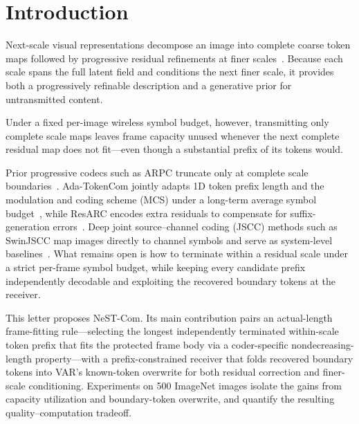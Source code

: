 \section{Introduction}
Next-scale visual representations decompose an image into complete coarse token maps followed by progressive residual refinements at finer scales~\cite{var}. Because each scale spans the full latent field and conditions the next finer scale, it provides both a progressively refinable description and a generative prior for untransmitted content.

Under a fixed per-image wireless symbol budget, however, transmitting only complete scale maps leaves frame capacity unused whenever the next complete residual map does not fit---even though a substantial prefix of its tokens would.

Prior progressive codecs such as ARPC truncate only at complete scale boundaries~\cite{arpc}. Ada-TokenCom jointly adapts 1D token prefix length and the modulation and coding scheme (MCS) under a long-term average symbol budget~\cite{adatokencom}, while ResARC encodes extra residuals to compensate for suffix-generation errors~\cite{resarc}. Deep joint source--channel coding (JSCC) methods such as SwinJSCC map images directly to channel symbols and serve as system-level baselines~\cite{swinjscc}. What remains open is how to terminate within a residual scale under a strict per-frame symbol budget, while keeping every candidate prefix independently decodable and exploiting the recovered boundary tokens at the receiver.

This letter proposes NeST-Com. Its main contribution pairs an actual-length frame-fitting rule---selecting the longest independently terminated within-scale token prefix that fits the protected frame body via a coder-specific nondecreasing-length property---with a prefix-constrained receiver that folds recovered boundary tokens into VAR's known-token overwrite for both residual correction and finer-scale conditioning. Experiments on 500 ImageNet images isolate the gains from capacity utilization and boundary-token overwrite, and quantify the resulting quality--computation tradeoff.
